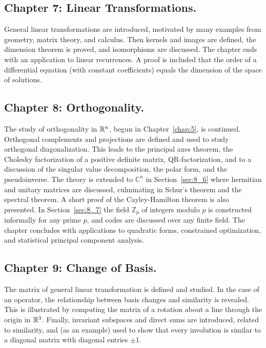 \subsection*{Chapter 7: Linear Transformations.}


General linear transformations are 
introduced, motivated by many examples from geometry, matrix theory, and
 calculus. Then kernels and images are defined, the dimension theorem is
 proved, and isomorphisms are discussed. The chapter ends with an 
application to linear recurrences. A proof is included that the order of
 a differential equation (with constant coefficients) equals the 
dimension of the space of solutions.



\subsection*{Chapter 8: Orthogonality.}


The study of orthogonality in $\mathbb{R}^n$, begun in Chapter~\ref{chap:5},
 is continued. Orthogonal complements and projections are defined and 
used to study orthogonal diagonalization. This leads to the principal 
axes theorem, the Cholesky factorization of a positive definite matrix, QR-factorization, and to a discussion of the singular value decomposition, the polar form, and the pseudoinverse. The theory is extended to $\mathbb{C}^n$ in Section~\ref{sec:8_6}
 where hermitian and unitary matrices are discussed, culminating in 
Schur's theorem and the spectral theorem. A short proof of the 
Cayley-Hamilton theorem is also presented. In Section~\ref{sec:8_7} the field $\mathbb{Z}_p$ of integers modulo $p$ is constructed informally for any prime $p$,
 and codes are discussed over any finite field. The chapter concludes 
with applications to quadratic forms, constrained optimization, and 
statistical principal component analysis.



\subsection*{Chapter 9: Change of Basis.}


The matrix of general linear 
transformation is defined and studied. In the case of an operator, the 
relationship between basis changes and similarity is revealed. This is 
illustrated by computing the matrix of a rotation about a line through 
the origin in $\mathbb{R}^3$.
 Finally, invariant subspaces and direct sums are introduced, related to
 similarity, and (as an example) used to show that every involution is 
similar to a diagonal matrix with diagonal entries $\pm 1$.



